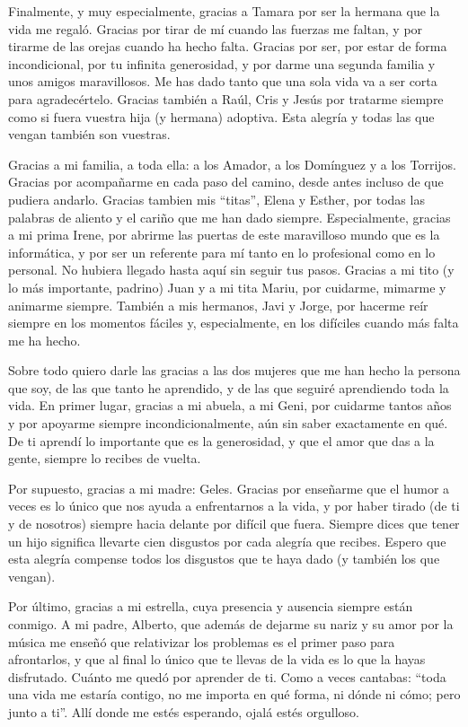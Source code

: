 \begin{acknowledgementslong}
Finalmente, y muy especialmente, gracias a Tamara por ser la hermana que la vida me regaló. Gracias por tirar de mí cuando las fuerzas me faltan, y por tirarme de las orejas cuando ha hecho falta. Gracias por ser, por estar de forma incondicional, por tu infinita generosidad, y por darme una segunda familia y unos amigos maravillosos. Me has dado tanto que una sola vida va a ser corta para agradecértelo. Gracias también a Raúl, Cris y Jesús por tratarme siempre como si fuera vuestra hija (y hermana) adoptiva. Esta alegría y todas las que vengan también son vuestras.  

Gracias a mi familia, a toda ella: a los Amador, a los Domínguez y a los Torrijos. Gracias por acompañarme en cada paso del camino, desde antes incluso de que pudiera andarlo. Gracias tambien mis ``titas'', Elena y Esther, por todas las palabras de aliento y el cariño que me han dado siempre. Especialmente, gracias a mi prima Irene, por abrirme las puertas de este maravilloso mundo que es la informática, y por ser un referente para mí tanto en lo profesional como en lo personal. No hubiera llegado hasta aquí sin seguir tus pasos. Gracias a mi tito (y lo más importante, padrino) Juan y a mi tita Mariu, por cuidarme, mimarme y animarme siempre. También a mis hermanos, Javi y Jorge, por hacerme reír siempre en los momentos fáciles y, especialmente, en los difíciles cuando más falta me ha hecho.


Sobre todo quiero darle las gracias a las dos mujeres que me han hecho la persona que soy, de las que tanto he aprendido, y de las que seguiré aprendiendo toda la vida. En primer lugar, gracias a mi abuela, a mi Geni, por cuidarme tantos años y por apoyarme siempre incondicionalmente, aún sin saber exactamente en qué. De ti aprendí lo importante que es la generosidad, y que el amor que das a la gente, siempre lo recibes de vuelta. 

Por supuesto, gracias a mi madre: Geles. Gracias por enseñarme que el humor a veces es lo único que nos ayuda a enfrentarnos a la vida, y por haber tirado (de ti y de nosotros) siempre hacia delante por difícil que fuera. Siempre dices que tener un hijo significa llevarte cien disgustos por cada alegría que recibes. Espero que esta alegría compense todos los disgustos que te haya dado (y también los que vengan).  

Por último, gracias a mi estrella, cuya presencia y ausencia siempre están conmigo. A mi padre, Alberto, que además de dejarme su nariz y su amor por la música me enseñó que relativizar los problemas es el primer paso para afrontarlos, y que al final lo único que te llevas de la vida es lo que la hayas disfrutado. Cuánto me quedó por aprender de ti. Como a veces cantabas: ``toda una vida me estaría contigo, no me importa en qué forma, ni dónde ni cómo; pero junto a ti''. Allí donde me estés esperando, ojalá estés orgulloso. 


\end{acknowledgementslong}

